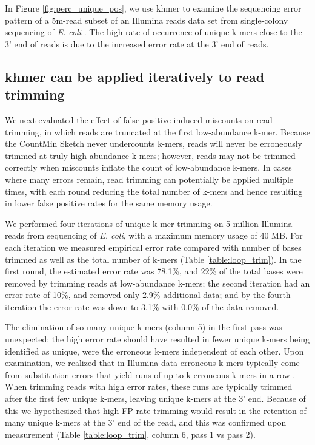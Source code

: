 \documentclass[10pt]{article}
\begin{document}
In Figure \ref{fig:perc_unique_pos}, we use khmer to examine the
sequencing error pattern of a 5m-read subset of an Illumina reads
data set from single-colony sequencing of {\em E. coli}
\cite{pubmed21926975}.  The high rate of occurrence of unique k-mers
close to the 3' end of reads is due to the increased error rate at the
3' end of reads.

\subsection*{khmer can be applied iteratively to read trimming}

We next evaluated the effect of false-positive induced miscounts on
read trimming, in which reads are truncated at the first low-abundance
k-mer.  Because the CountMin Sketch never undercounts k-mers, reads
will never be erroneously trimmed at truly high-abundance k-mers;
however, reads may not be trimmed correctly when miscounts inflate the
count of low-abundance k-mers.  In cases where many errors remain,
read trimming can potentially be applied multiple times, with each
round reducing the total number of k-mers and hence resulting in
lower false positive rates for the same memory usage.

We performed four iterations of unique k-mer trimming on 5 million
Illumina reads from sequencing of {\em E. coli}, with a maximum memory
usage of 40 MB.  For each iteration we measured empirical error rate
compared with number of bases trimmed as well as the total number of
k-mers (Table \ref{table:loop_trim}).  In the first round, the
estimated error rate was 78.1\%, and 22\% of the total bases were
removed by trimming reads at low-abundance k-mers; the second
iteration had an error rate of 10\%, and removed only 2.9\% additional
data; and by the fourth iteration the error rate was down to 3.1\%
with 0.0\% of the data removed.

The elimination of so many unique k-mers (column 5) in the first pass
was unexpected: the high error rate should have resulted in fewer
unique k-mers being identified as unique, were the erroneous k-mers
independent of each other. Upon examination, we realized that in
Illumina data erroneous k-mers typically come from substitution errors
that yield runs of up to k erroneous k-mers in a row
\cite{Kelley2010}.  When trimming reads with high error rates, these
runs are typically trimmed after the first few unique k-mers, leaving
unique k-mers at the 3' end.  Because of this we hypothesized that
high-FP rate trimming would result in the retention of many unique
k-mers at the 3' end of the read, and this was confirmed upon
measurement (Table \ref{table:loop_trim}, column 6, pass 1 vs pass 2).
\end{document}
